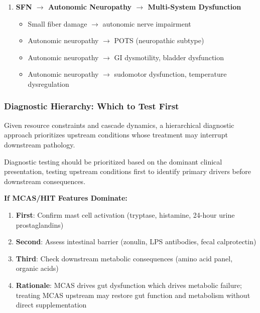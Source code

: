 \begin{enumerate}
    \item \textbf{SFN $\rightarrow$ Autonomic Neuropathy $\rightarrow$ Multi-System Dysfunction}
    \begin{itemize}
        \item Small fiber damage $\rightarrow$ autonomic nerve impairment
        \item Autonomic neuropathy $\rightarrow$ POTS (neuropathic subtype)
        \item Autonomic neuropathy $\rightarrow$ GI dysmotility, bladder dysfunction
        \item Autonomic neuropathy $\rightarrow$ sudomotor dysfunction, temperature dysregulation
    \end{itemize}
\end{enumerate}

\subsubsection{Diagnostic Hierarchy: Which to Test First}
\label{sec:septad-diagnostic-hierarchy}

Given resource constraints and cascade dynamics, a hierarchical diagnostic approach prioritizes upstream conditions whose treatment may interrupt downstream pathology.

\begin{observation}
\label{obs:septad-test-hierarchy}
Diagnostic testing should be prioritized based on the dominant clinical presentation, testing upstream conditions first to identify primary drivers before downstream consequences.
\end{observation}

\textbf{If MCAS/HIT Features Dominate:}
\begin{enumerate}
    \item \textbf{First}: Confirm mast cell activation (tryptase, histamine, 24-hour urine prostaglandins)
    \item \textbf{Second}: Assess intestinal barrier (zonulin, LPS antibodies, fecal calprotectin)
    \item \textbf{Third}: Check downstream metabolic consequences (amino acid panel, organic acids)
    \item \textbf{Rationale}: MCAS drives gut dysfunction which drives metabolic failure; treating MCAS upstream may restore gut function and metabolism without direct supplementation
\end{enumerate}

